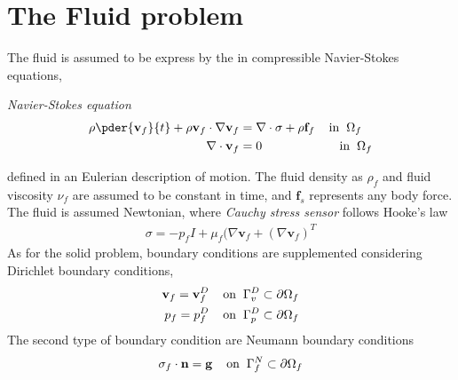 \section{The Fluid problem}
\label{sec:fluidprob}
The fluid is assumed to be express by the in compressible Navier-Stokes equations,
\begin{equat}
\textit{Navier-Stokes equation}
\begin{align}
\rho \pder{\mathbf{v}_f}{t} + \rho \mathbf{v}_f \cdot \nabla \mathbf{v}_f &=
\nabla \cdot \sigma + \rho \mathbf{f}_f \hspace{4mm} \text{in} \hspace{2mm} \Omega_f \\
\nabla \cdot \mathbf{v}_f &= 0 \hspace{22mm} \text{in} \hspace{2mm} \Omega_f 
\end{align} 
\end{equat}
defined in an Eulerian description of motion. The fluid density as $\rho_f$ and fluid viscosity $\nu_f$  are assumed to be constant in time, and $\mathbf{f}_s$ represents any body force. 
The fluid is assumed Newtonian, where \textit{Cauchy stress sensor} follows Hooke's law
\begin{align*}
\sigma = -p_f I + \mu_f (\nabla \mathbf{v}_f + (\nabla \mathbf{v}_f)^T
\end{align*}
As for the solid problem, boundary conditions are supplemented considering  Dirichlet boundary conditions, 
\begin{align}
\mathbf{v}_f = \mathbf{v}_f^D 
\hspace{4mm} \text{on} \hspace{2mm} \Gamma_v^D \subset \partial \Omega_f \\
p_f = p_f^D 
\hspace{4mm} \text{on} \hspace{2mm} \Gamma_p^D \subset \partial \Omega_f
\end{align}
The second type of boundary condition are Neumann boundary conditions
\begin{align}
\sigma_f \cdot \mathbf{n} = \mathbf{g} 
\hspace{4mm} \text{on} \hspace{2mm} \Gamma_f^N \subset \partial \Omega_f 
\end{align}
